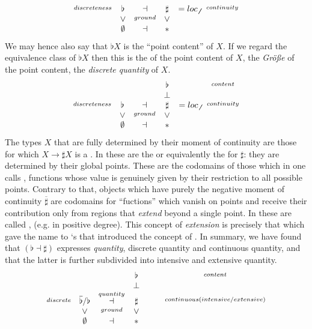 \begin{displaymath}
\begin{matrix}
\stackrel{discreteness}{} & \flat &\dashv& \sharp &= loc_{\not\not}& \stackrel{continuity}{}
\\
& \vee &\stackrel{ground}{}& \vee
\\
& \emptyset &\dashv& \ast &
\end{matrix}
\end{displaymath}
We may hence also say that $\flat X$ is the ``point content'' of $X$. If we regard the equivalence class of $\flat X$ then this is the  of the point content of $X$, the \emph{Größe} of the point content, the \emph{discrete quantity} of $X$.
\begin{displaymath}
\begin{matrix}
& && \flat && \stackrel{content}{}
\\
& && \bot &
\\
\stackrel{discreteness}{} & \flat &\dashv& \sharp & = loc_{\not \not}&  \stackrel{continuity}{}
\\
& \vee &\stackrel{ground}{}& \vee
\\
& \emptyset &\dashv& \ast &
\end{matrix}
\end{displaymath}
The types $X$ that are fully determined by their moment of continuity are those for which $X \to \sharp X$ is a . In  these are the  or equivalently the  for $\sharp$: they are determined by their global points. These are the codomains of those  which in  one calls , functions whose value is genuinely given by their restriction to all possible points.
Contrary to that, objects which have purely the negative moment of continuity $\overline{\sharp}$ are codomains for ``fuctions'' which vanish on points and receive their contribution only from regions that \emph{extend} beyond a single point. In  these are called , (e.g.  in positive degree). This concept of \emph{extension} is precisely that which gave the name to `s  that introduced the concept of  .
In summary, we have found that $(\flat \dashv \sharp)$ expresses \emph{quantity}, discrete quantity and continuous quantity, and that the latter is further subdivided into intensive and extensive quantity.
\begin{displaymath}
\begin{matrix}
& && \flat & && \stackrel{content}{}
\\
& && \bot & &&
\\
\stackrel{discrete}{} & \overline{\flat}/\flat &\stackrel{quantity}{\dashv}& \sharp &  &   & \stackrel{continuous (intensive/extensive)}{}
\\
& \vee &\stackrel{ground}{}& \vee
\\
& \emptyset &\dashv& \ast &
\end{matrix}
\end{displaymath}

